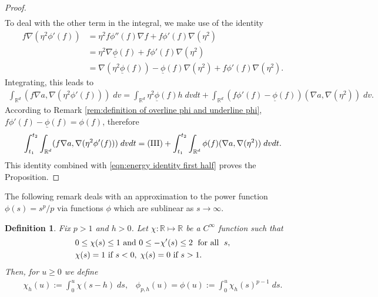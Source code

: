 \documentclass[12pt,american]{amsart}
\numberwithin{equation}{section}
\theoremstyle{plain}
\newtheorem{DEF}[thm]{Definition}
\theoremstyle{definition}                  %
\begin{document}
\begin{proof}
\begin{align}
    \end{align}	
    To deal with the other term in the integral, we make use of the identity
    \begin{align*}
      f \nabla (\eta^2 \phi'(f)) & = \eta^2 f\phi''(f)\nabla f+f\phi'(f)\nabla (\eta^2)\\
  	& = \eta^2 \nabla \underline{\phi}(f)+f\phi'(f)\nabla (\eta^2)\\
  	& = \nabla (\eta^2 \underline{\phi}(f) )- \underline{\phi}(f)\nabla (\eta^2)+f\phi'(f)\nabla (\eta^2).	  
    \end{align*}	  
    Integrating, this leads to
    \begin{align*}
      \int_{\mathbb{R}^d}(f\nabla a,\nabla (\eta^2 \phi'(f)) )\;dv = \int_{\mathbb{R}^d} \eta^2\underline{\phi}(f) h\;dvdt+\int_{\mathbb{R}^d}(f\phi'(f)-\underline{\phi}(f))(\nabla a,\nabla (\eta^2))\;dv.		
    \end{align*}
    According to Remark \ref{rem:definition of overline phi and underline phi}, $f\phi'(f)-\underline{\phi}(f) = \phi(f)$, therefore
    \begin{align*}
      \int_{t_1}^{t_2}\int_{\mathbb{R}^d}(f\nabla a,\nabla (\eta^2 \phi'(f)) )\;dvdt = \textnormal{(III)}+\int_{t_1}^{t_2}\int_{\mathbb{R}^d}\phi(f)(\nabla a,\nabla (\eta^2))\;dvdt.		
    \end{align*}
    This identity combined with \eqref{eqn:energy identity first half} proves the Proposition.
  \end{proof}

  The following remark deals with an approximation to the power function $\phi(s) = s^p/p$ via functions $\phi$ which are sublinear as $s\to\infty$.
  \begin{DEF}\label{def:Definitions of approximations to p-th power I}
    Fix $p>1$ and $h>0$. Let $\chi:\mathbb{R}\mapsto\mathbb{R}$ be a $C^\infty$ function such that 
    \begin{align*}
      & 0\leq \chi(s) \leq 1 \textnormal{ and } 0 \leq -\chi'(s)\leq 2 \;\textnormal{ for all } \;s,\\
      &\chi(s) =1 \textnormal{ if } s<0,\;\chi(s) = 0 \textnormal{ if } s>1.
    \end{align*}
    Then, for $u\geq 0$ we define
    \begin{align}\label{eqn:def of approximations to the pth power}
      \chi_h(u) := \int_{0}^u\chi(s-h)\;ds,\;\;\; \phi_{p,h}(u) = \phi(u) :=  \int_0^u\chi_h(s)^{p-1}\;ds.
    \end{align}
  \end{DEF}
\end{document}
